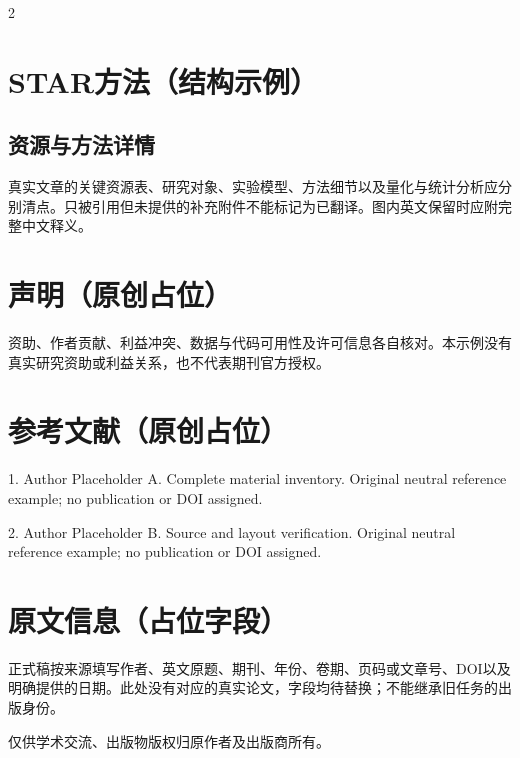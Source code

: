 \documentclass[UTF8,fontset=none,twoside,scheme=plain]{ctexart}
\begin{document}
\begin{multicols}{2}
\section*{STAR方法（结构示例）}
\subsection*{资源与方法详情}
真实文章的关键资源表、研究对象、实验模型、方法细节以及量化与统计分析应分别清点。只被引用但未提供的补充附件不能标记为已翻译。图内英文保留时应附完整中文释义。
\section*{声明（原创占位）}
资助、作者贡献、利益冲突、数据与代码可用性及许可信息各自核对。本示例没有真实研究资助或利益关系，也不代表期刊官方授权。
\section*{参考文献（原创占位）}
{\fontsize{7.6bp}{9.8bp}\selectfont{}
\noindent\hypertarget{med-ref:1}{1.} Author Placeholder A. Complete material inventory. Original neutral reference example; no publication or DOI assigned.\par\smallskip
\noindent\hypertarget{med-ref:2}{2.} Author Placeholder B. Source and layout verification. Original neutral reference example; no publication or DOI assigned.\par}
\section*{原文信息（占位字段）}
正式稿按来源填写作者、英文原题、期刊、年份、卷期、页码或文章号、DOI以及明确提供的日期。此处没有对应的真实论文，字段均待替换；不能继承旧任务的出版身份。\par
仅供学术交流、出版物版权归原作者及出版商所有。
\end{multicols}
\end{document}
